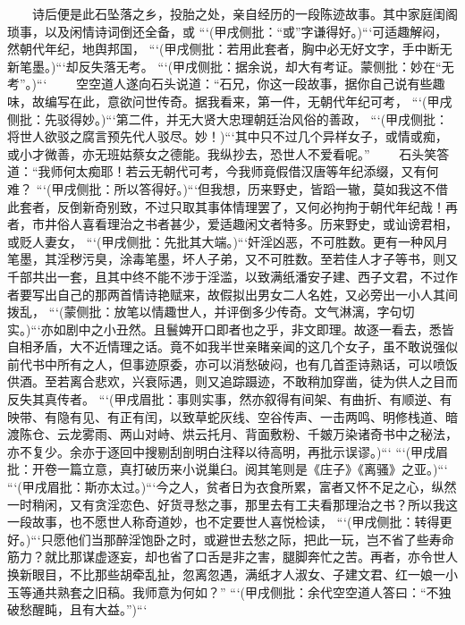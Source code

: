 \documentclass[
    ref = refDemo.bib,
    coverpage = cover.pdf,
    geometry = b5,
    lang = cn
]{spBook}
\begin{document}
    　　诗后便是此石坠落之乡，投胎之处，亲自经历的一段陈迹故事。其中家庭闺阁琐事，以及闲情诗词倒还全备，或 ```(甲戌侧批：“或”字谦得好。)```可适趣解闷，然朝代年纪，地舆邦国， ```(甲戌侧批：若用此套者，胸中必无好文字，手中断无新笔墨。)```却反失落无考。 ```(甲戌侧批：据余说，却大有考证。蒙侧批：妙在“无考”。)```  
    　　空空道人遂向石头说道：“石兄，你这一段故事，据你自己说有些趣味，故编写在此，意欲问世传奇。据我看来，第一件，无朝代年纪可考， ```(甲戌侧批：先驳得妙。)```第二件，并无大贤大忠理朝廷治风俗的善政， ```(甲戌侧批：将世人欲驳之腐言预先代人驳尽。妙！)```其中只不过几个异样女子，或情或痴，或小才微善，亦无班姑蔡女之德能。我纵抄去，恐世人不爱看呢。”  
    　　石头笑答道：“我师何太痴耶！若云无朝代可考，今我师竟假借汉唐等年纪添缀，又有何难？ ```(甲戌侧批：所以答得好。)```但我想，历来野史，皆蹈一辙，莫如我这不借此套者，反倒新奇别致，不过只取其事体情理罢了，又何必拘拘于朝代年纪哉！再者，市井俗人喜看理治之书者甚少，爱适趣闲文者特多。历来野史，或讪谤君相，或贬人妻女， ```(甲戌侧批：先批其大端。)```奸淫凶恶，不可胜数。更有一种风月笔墨，其淫秽污臭，涂毒笔墨，坏人子弟，又不可胜数。至若佳人才子等书，则又千部共出一套，且其中终不能不涉于淫滥，以致满纸潘安子建、西子文君，不过作者要写出自己的那两首情诗艳赋来，故假拟出男女二人名姓，又必旁出一小人其间拨乱， ```(蒙侧批：放笔以情趣世人，并评倒多少传奇。文气淋漓，字句切实。)```亦如剧中之小丑然。且鬟婢开口即者也之乎，非文即理。故逐一看去，悉皆自相矛盾，大不近情理之话。竟不如我半世亲睹亲闻的这几个女子，虽不敢说强似前代书中所有之人，但事迹原委，亦可以消愁破闷，也有几首歪诗熟话，可以喷饭供酒。至若离合悲欢，兴衰际遇，则又追踪蹑迹，不敢稍加穿凿，徒为供人之目而反失其真传者。 ```(甲戌眉批：事则实事，然亦叙得有间架、有曲折、有顺逆、有映带、有隐有见、有正有闰，以致草蛇灰线、空谷传声、一击两鸣、明修栈道、暗渡陈仓、云龙雾雨、两山对峙、烘云托月、背面敷粉、千皴万染诸奇书中之秘法，亦不复少。余亦于逐回中搜剔刮剖明白注释以待高明，再批示误谬。)``` ```(甲戌眉批：开卷一篇立意，真打破历来小说巢臼。阅其笔则是《庄子》《离骚》之亚。)``` ```(甲戌眉批：斯亦太过。)```今之人，贫者日为衣食所累，富者又怀不足之心，纵然一时稍闲，又有贪淫恋色、好货寻愁之事，那里去有工夫看那理治之书？所以我这一段故事，也不愿世人称奇道妙，也不定要世人喜悦检读， ```(甲戌侧批：转得更好。)```只愿他们当那醉淫饱卧之时，或避世去愁之际，把此一玩，岂不省了些寿命筋力？就比那谋虚逐妄，却也省了口舌是非之害，腿脚奔忙之苦。再者，亦令世人换新眼目，不比那些胡牵乱扯，忽离忽遇，满纸才人淑女、子建文君、红一娘一小玉等通共熟套之旧稿。我师意为何如？” ```(甲戌侧批：余代空空道人答曰：“不独破愁醒盹，且有大益。”)```  
\end{document}
